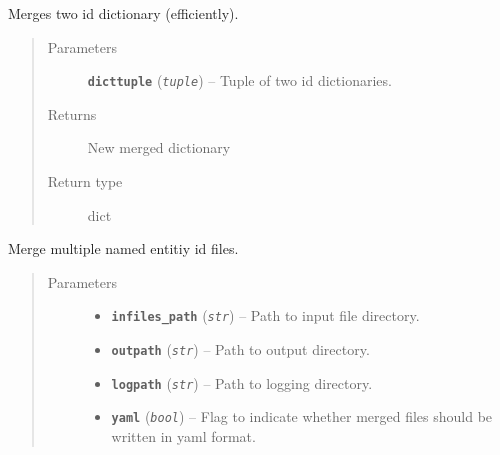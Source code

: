 \documentclass[letterpaper,10pt,english]{sphinxmanual}
\begin{document}

\begin{fulllineitems}
\label{src.prep.nes:src.prep.nes.merge.merge_id_dicts}
Merges two id dictionary (efficiently).
\begin{quote}\begin{description}
\item[{Parameters}] \leavevmode
\textbf{\texttt{dicttuple}} (\emph{\texttt{tuple}}) -- Tuple of two id dictionaries.

\item[{Returns}] \leavevmode
New merged dictionary

\item[{Return type}] \leavevmode
dict

\end{description}\end{quote}

\end{fulllineitems}


\begin{fulllineitems}
\label{src.prep.nes:src.prep.nes.merge.merge_id_files}
Merge multiple named entitiy id files.
\begin{quote}\begin{description}
\item[{Parameters}] \leavevmode\begin{itemize}
\item {} 
\textbf{\texttt{infiles\_path}} (\emph{\texttt{str}}) -- Path to input file directory.

\item {} 
\textbf{\texttt{outpath}} (\emph{\texttt{str}}) -- Path to output directory.

\item {} 
\textbf{\texttt{logpath}} (\emph{\texttt{str}}) -- Path to logging directory.

\item {} 
\textbf{\texttt{yaml}} (\emph{\texttt{bool}}) -- Flag to indicate whether merged files should be written in yaml format.

\end{itemize}

\end{description}\end{quote}

\end{fulllineitems}
\end{document}
